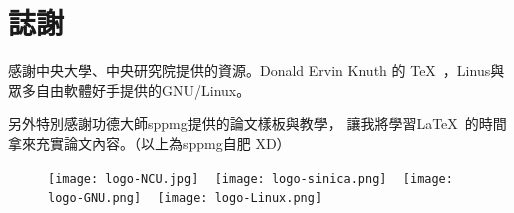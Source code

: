 \documentclass[class=NCU_thesis, crop=false]{standalone}
\begin{document}
\chapter{誌謝}

感謝中央大學、中央研究院提供的資源。Donald Ervin Knuth 的 \TeX\ ，Linus與眾多自由軟體好手提供的GNU/Linux。

另外特別感謝功德大師sppmg提供的論文樣板與教學\cite{_sppmg/tw_thesis_template_????}，
讓我將學習\LaTeX\ 的時間拿來充實論文內容。（以上為sppmg自肥 XD）

\begin{figure}[!hbt]
    \captionsetup[subfigure]{labelformat=empty}
    \centering
    \subcaptionbox
        {}
        {\texttt{[image: logo-NCU.jpg]}}
    ~
    \subcaptionbox
        {}
        {\texttt{[image: logo-sinica.png]}}
    ~
    \subcaptionbox
        {}
        {\texttt{[image: logo-GNU.png]}}
    ~
    \subcaptionbox
        {}
        {\texttt{[image: logo-Linux.png]}}
\end{figure}
\end{document}
